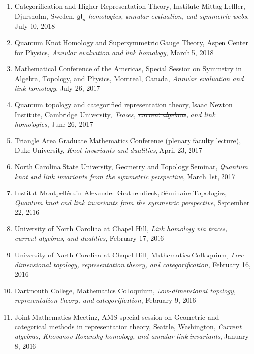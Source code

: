 \documentclass[10pt]{article}
\begin{document}
\begin{enumerate}
\item Categorification and Higher Representation Theory,
Institute-Mittag Leffler, Djursholm, Sweden,
\emph{$\mathfrak{gl}_n$ homologies, annular evaluation, and symmetric webs},
July 10, 2018

\item Quantum Knot Homology and Supersymmetric Gauge Theory, 
Aspen Center for Physics, 
\emph{Annular evaluation and link homology},
March 5, 2018

\item Mathematical Conference of the Americas,
Special Session on Symmetry in Algebra, Topology, and Physics,
Montreal, Canada,
\emph{Annular evaluation and link homology},
July 26, 2017

\item Quantum topology and categorified representation theory, 
Isaac Newton Institute, Cambridge University, 
\emph{Traces, \sout{current algebras}, and link homologies}, 
June 26, 2017

\item Triangle Area Graduate Mathematics Conference (plenary faculty lecture), 
Duke University, 
\emph{Knot invariants and dualities}, 
April 23, 2017

\item North Carolina State University, Geometry and Topology Seminar, 
\emph{Quantum knot and link invariants from the symmetric perspective},
March 1st, 2017

\item Institut Montpell\'{e}rain Alexander Grothendieck, S\'{e}minaire Topologies, 
\emph{Quantum knot and link invariants from the symmetric perspective},
September 22, 2016

\item University of North Carolina at Chapel Hill, 
\emph{Link homology via traces, current algebras, and dualities},
February 17, 2016

\item University of North Carolina at Chapel Hill, 
Mathematics Colloquium,
\emph{Low-dimensional topology, representation theory, and categorification},
February 16, 2016

\item Dartmouth College, Mathematics Colloquium,
\emph{Low-dimensional topology, representation theory, and categorification},
February 9, 2016

\item Joint Mathematics Meeting, AMS special session on 
Geometric and categorical methods in representation theory, 
Seattle, Washington,
\emph{Current algebras, Khovanov-Rozansky homology, and annular link invariants},
January 8, 2016


\end{enumerate}
\end{document}
